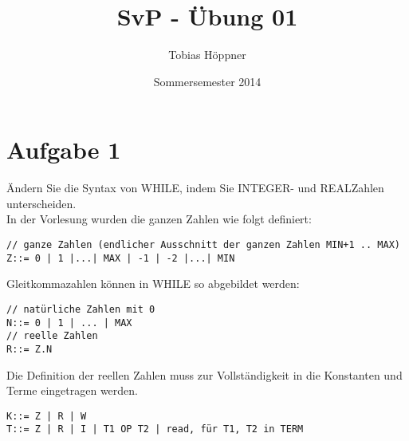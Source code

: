 \documentclass[ngerman,a4paper]{report}
\author{Tobias Höppner}
\title{SvP - Übung 01}
\date{Sommersemester 2014}
\renewcommand{\maketitle}{}
\begin{document}
 
\maketitle 
\section*{Aufgabe 1}
Ändern Sie die Syntax von WHILE, indem Sie INTEGER- und REALZahlen unterscheiden.\\
In der Vorlesung wurden die ganzen Zahlen wie folgt definiert:
\begin{lstlisting}
// ganze Zahlen (endlicher Ausschnitt der ganzen Zahlen MIN+1 .. MAX)
Z::= 0 | 1 |...| MAX | -1 | -2 |...| MIN 
\end{lstlisting}
Gleitkommazahlen können in WHILE so abgebildet werden:
\begin{lstlisting}
// natürliche Zahlen mit 0
N::= 0 | 1 | ... | MAX
// reelle Zahlen
R::= Z.N
\end{lstlisting}
Die Definition der reellen Zahlen muss zur Vollständigkeit in die Konstanten und Terme eingetragen werden.
\begin{lstlisting}
K::= Z | R | W
T::= Z | R | I | T1 OP T2 | read, für T1, T2 in TERM
\end{lstlisting}
\end{document}
